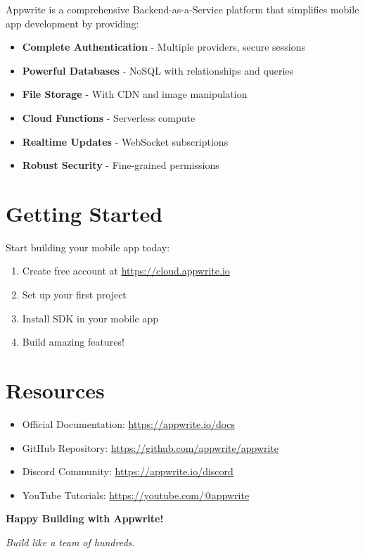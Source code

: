 \documentclass[11pt,a4paper,oneside]{book}
\begin{document}
Appwrite is a comprehensive Backend-as-a-Service platform that simplifies mobile app development by providing:

\begin{itemize}
    \item \textbf{Complete Authentication} - Multiple providers, secure sessions
    \item \textbf{Powerful Databases} - NoSQL with relationships and queries
    \item \textbf{File Storage} - With CDN and image manipulation
    \item \textbf{Cloud Functions} - Serverless compute
    \item \textbf{Realtime Updates} - WebSocket subscriptions
    \item \textbf{Robust Security} - Fine-grained permissions
\end{itemize}

\section{Getting Started}

\begin{keypoint}
Start building your mobile app today:
\begin{enumerate}
    \item Create free account at \url{https://cloud.appwrite.io}
    \item Set up your first project
    \item Install SDK in your mobile app
    \item Build amazing features!
\end{enumerate}
\end{keypoint}

\section{Resources}

\begin{itemize}
    \item Official Documentation: \url{https://appwrite.io/docs}
    \item GitHub Repository: \url{https://github.com/appwrite/appwrite}
    \item Discord Community: \url{https://appwrite.io/discord}
    \item YouTube Tutorials: \url{https://youtube.com/@appwrite}
\end{itemize}

\vspace{2cm}

\begin{center}
\Large\textbf{Happy Building with Appwrite!}

\vspace{0.5cm}

\textit{Build like a team of hundreds.}
\end{center}
\end{document}
